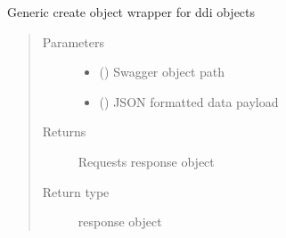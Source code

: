 \documentclass[letterpaper,10pt,english]{sphinxmanual}
\begin{document}
\begin{fulllineitems}
\begin{fulllineitems}
\begin{quote}
\begin{description}
\end{description}\end{quote}

\end{fulllineitems}


\begin{fulllineitems}
\label{\detokenize{b1ddi-class:bloxone.b1ddi.replace}}
\sphinxAtStartPar
Generic create object wrapper for ddi objects
\begin{quote}\begin{description}
\item[{Parameters}] \leavevmode\begin{itemize}
\item {} 
\sphinxAtStartPar
{} () \textendash{} Swagger object path

\item {} 
\sphinxAtStartPar
{} () \textendash{} JSON formatted data payload

\end{itemize}

\item[{Returns}] \leavevmode
\sphinxAtStartPar
Requests response object

\item[{Return type}] \leavevmode
\sphinxAtStartPar
response object

\end{description}\end{quote}

\end{fulllineitems}



\end{fulllineitems}
\end{document}
